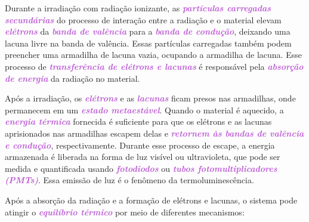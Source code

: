 \documentclass[11pt,a4paper]{article}
\begin{document}
	Durante a irradiação com radiação ionizante, as \textcolor{MediumOrchid}{\textit{\textbf{partículas carregadas secundárias}}} do processo de interação entre a radiação e o material elevam \textcolor{MediumOrchid}{\textit{\textbf{elétrons}}} da \textcolor{MediumOrchid}{\textit{\textbf{banda de valência}}} para a \textcolor{MediumOrchid}{\textit{\textbf{banda de condução}}}, deixando uma lacuna livre na banda de valência. Essas partículas carregadas também podem preencher uma armadilha de lacuna vazia, ocupando a armadilha de lacuna. Esse processo de \textcolor{MediumOrchid}{\textit{\textbf{transferência de elétrons e lacunas}}} é responsável pela \textcolor{MediumOrchid}{\textit{\textbf{absorção de energia}}} da radiação no material.

	Após a irradiação, os \textcolor{MediumOrchid}{\textit{\textbf{elétrons}}} e as \textcolor{MediumOrchid}{\textit{\textbf{lacunas}}} ficam presos nas armadilhas, onde permanecem em um \textcolor{MediumOrchid}{\textit{\textbf{estado metaestável}}}. Quando o material é aquecido, a \textcolor{MediumOrchid}{\textit{\textbf{energia térmica}}} fornecida é suficiente para que os elétrons e as lacunas aprisionados nas armadilhas escapem delas e \textcolor{MediumOrchid}{\textit{\textbf{retornem às bandas de valência e condução}}}, respectivamente. Durante esse processo de escape, a energia armazenada é liberada na forma de luz visível ou ultravioleta, que pode ser medida e quantificada usando \textcolor{MediumOrchid}{\textit{\textbf{fotodiodos}}} ou \textcolor{MediumOrchid}{\textit{\textbf{tubos fotomultiplicadores (PMTs)}}}. Essa emissão de luz é o fenômeno da termoluminescência.

	Após a absorção da radiação e a formação de elétrons e lacunas, o sistema pode atingir o \textcolor{MediumOrchid}{\textit{\textbf{equilíbrio térmico}}} por meio de diferentes mecanismos:
\end{document}
